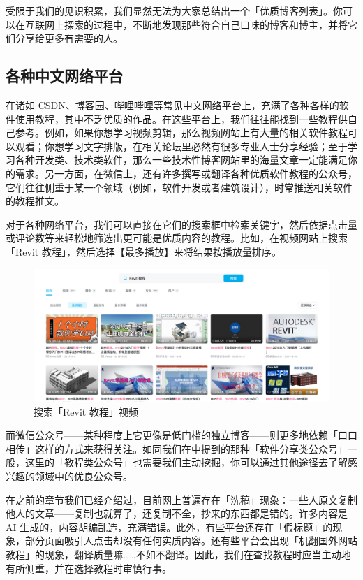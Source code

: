 受限于我们的见识积累，我们显然无法为大家总结出一个「优质博客列表」。你可以在互联网上探索的过程中，不断地发现那些符合自己口味的博客和博主，并将它们分享给更多有需要的人。

\subsection{各种中文网络平台}

在诸如 CSDN、博客园、哔哩哔哩等常见中文网络平台上，充满了各种各样的软件使用教程，其中不乏优质的作品。在这些平台上，我们往往能找到一些教程供自己参考。例如，如果你想学习视频剪辑，那么视频网站上有大量的相关软件教程可以观看；你想学习文字排版，在相关论坛里必然有很多专业人士分享经验；至于学习各种开发类、技术类软件，那么一些技术性博客网站里的海量文章一定能满足你的需求。另一方面，在微信上，还有许多撰写或翻译各种优质软件教程的公众号，它们往往侧重于某一个领域（例如，软件开发或者建筑设计），时常推送相关软件的教程推文。

对于各种网络平台，我们可以直接在它们的搜索框中检索关键字，然后依据点击量或评论数等来轻松地筛选出更可能是优质内容的教程。比如，在视频网站上搜索「Revit 教程」，然后选择【最多播放】来将结果按播放量排序。

\begin{figure}[htb!]
  \centering
  \includegraphics[width=.72\textwidth]{assets/software/Searching_Revit_tutorials_on_bilibili.png}
  \caption{搜索「Revit 教程」视频}
  \label{fig:Searching_Revit_tutorials_on_bilibili}
\end{figure}

而微信公众号——某种程度上它更像是低门槛的独立博客——则更多地依赖「口口相传」这样的方式来获得关注。如同我们在中提到的那种「软件分享类公众号」一般，这里的「教程类公众号」也需要我们主动挖掘，你可以通过其他途径去了解感兴趣的领域中的优良公众号。

在之前的章节我们已经介绍过，目前网上普遍存在「洗稿」现象：一些人原文复制他人的文章——复制也就算了，还复制不全，抄来的东西都是错的。许多内容是 AI 生成的，内容胡编乱造，充满错误。此外，有些平台还存在「假标题」的现象，部分页面吸引人点击却没有任何实质内容。还有些平台会出现「机翻国外网站教程」的现象，翻译质量嘛……不如不翻译。因此，我们在查找教程时应当主动地有所侧重，并在选择教程时审慎行事。

